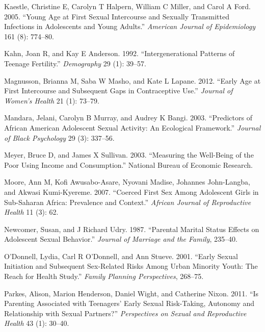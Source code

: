 \documentclass[
]{article}
\newlength{\cslhangindent}
\newenvironment{cslreferences}%
  {\setlength{\parindent}{0pt}%
  \everypar{\setlength{\hangindent}{\cslhangindent}}\ignorespaces}%
  {\par}
\begin{document}
\begin{cslreferences}
\leavevmode\hypertarget{ref-kaestle2005young}{}%
Kaestle, Christine E, Carolyn T Halpern, William C Miller, and Carol A
Ford. 2005. ``Young Age at First Sexual Intercourse and Sexually
Transmitted Infections in Adolescents and Young Adults.'' \emph{American
Journal of Epidemiology} 161 (8): 774--80.

\leavevmode\hypertarget{ref-kahn1992intergenerational}{}%
Kahn, Joan R, and Kay E Anderson. 1992. ``Intergenerational Patterns of
Teenage Fertility.'' \emph{Demography} 29 (1): 39--57.

\leavevmode\hypertarget{ref-magnusson2012early}{}%
Magnusson, Brianna M, Saba W Masho, and Kate L Lapane. 2012. ``Early Age
at First Intercourse and Subsequent Gaps in Contraceptive Use.''
\emph{Journal of Women's Health} 21 (1): 73--79.

\leavevmode\hypertarget{ref-mandara2003predictors}{}%
Mandara, Jelani, Carolyn B Murray, and Audrey K Bangi. 2003.
``Predictors of African American Adolescent Sexual Activity: An
Ecological Framework.'' \emph{Journal of Black Psychology} 29 (3):
337--56.

\leavevmode\hypertarget{ref-meyer2003measuring}{}%
Meyer, Bruce D, and James X Sullivan. 2003. ``Measuring the Well-Being
of the Poor Using Income and Consumption.'' National Bureau of Economic
Research.

\leavevmode\hypertarget{ref-moore2007coerced}{}%
Moore, Ann M, Kofi Awusabo-Asare, Nyovani Madise, Johannes John-Langba,
and Akwasi Kumi-Kyereme. 2007. ``Coerced First Sex Among Adolescent
Girls in Sub-Saharan Africa: Prevalence and Context.'' \emph{African
Journal of Reproductive Health} 11 (3): 62.

\leavevmode\hypertarget{ref-newcomer1987parental}{}%
Newcomer, Susan, and J Richard Udry. 1987. ``Parental Marital Status
Effects on Adolescent Sexual Behavior.'' \emph{Journal of Marriage and
the Family}, 235--40.

\leavevmode\hypertarget{ref-o2001early}{}%
O'Donnell, Lydia, Carl R O'Donnell, and Ann Stueve. 2001. ``Early Sexual
Initiation and Subsequent Sex-Related Risks Among Urban Minority Youth:
The Reach for Health Study.'' \emph{Family Planning Perspectives},
268--75.

\leavevmode\hypertarget{ref-parkes2011parenting}{}%
Parkes, Alison, Marion Henderson, Daniel Wight, and Catherine Nixon.
2011. ``Is Parenting Associated with Teenagers' Early Sexual
Risk-Taking, Autonomy and Relationship with Sexual Partners?''
\emph{Perspectives on Sexual and Reproductive Health} 43 (1): 30--40.


\end{cslreferences}
\end{document}
